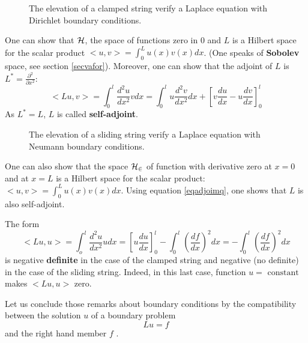 \documentclass[12pt]{book}
\begin{document}
\begin{figure}[htb]
 \centerline{}   
 \caption{The elevation of a clamped string verify a Laplace equation with
   Dirichlet boundary conditions.} 
 \label{figcordef}
\end{figure}

One can show that 
$\cal H$,
the space of functions zero in $0$ and $L$ is a Hilbert space for the scalar
product  $\mathrel{<} u,v \mathrel{>}=\int_0^L u(x)v(x) dx$.
(One speaks of {\bf Sobolev} space, see section \ref{secvafor}).
Moreover, one can show that the adjoint of $L$ is 
 $L^*=\frac{\partial^{2}}{\partial x^{2}}$:
\begin{equation}\label{eqadjoimq}
<Lu,v>=\int_0^l \frac{d^2u}{dx^2}vdx=
\int_0^lu\frac{d^2v}{dx^2}dx+[v\frac{du}{dx}-u\frac{dv}{dx}]^l_0 
\end{equation}
As $L^*=L$,  $L$ is called {\bf self-adjoint}.

\begin{figure}[htb]
 \centerline{}   
 \caption{The elevation of a sliding string verify a Laplace equation with
   Neumann boundary conditions.}
 \label{figcordeg}
\end{figure}
One can also show that the space $\cal H_2$ of function with derivative zero
at $x=0$ and at $x=L$ is a Hilbert space for the scalar product: $\mathrel{<} u,v
\mathrel{>}=\int_0^Lu(x)v(x) dx$. 
Using equation \ref{eqadjoimq}, one shows that $L$ is also self-adjoint.

The form 
\begin{equation}
<Lu,u>=\int_o^l\frac{d^2u}{dx^2}udx=
[u\frac{du}{dx}]_0^l-\int_0^l(\frac{df}{dx})^2dx=
-\int_0^l(\frac{df}{dx})^2dx 
\end{equation}
is negative {\bf definite} in the case of the clamped string and negative (no
definite) in the case of the sliding string. Indeed, in this last case,
function $u=\mbox{ constant }$ makes  $<Lu,u>$ zero.

Let us conclude those remarks about boundary conditions by the compatibility
between the solution $u$ of a boundary problem
\begin{equation}
Lu=f
\end{equation}
and the right hand member $f$ \cite{ma:equad:Dautray1,ph:elect:VanBladel75}.
\end{document}
